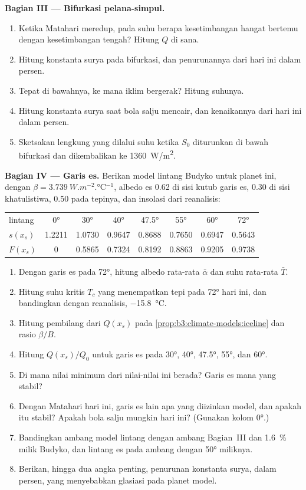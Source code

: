 \begin{problem}
\medskip\noindent\textbf{Bagian III --- Bifurkasi pelana-simpul.}
\begin{enumerate}[resume]
\item Ketika Matahari meredup, pada suhu berapa kesetimbangan hangat bertemu
  dengan kesetimbangan tengah? Hitung $Q$ di sana.
\item Hitung konstanta surya pada bifurkasi, dan penurunannya dari
  hari ini dalam persen.
\item Tepat di bawahnya, ke mana iklim bergerak? Hitung suhunya.
\item Hitung konstanta surya saat bola salju mencair, dan kenaikannya
  dari hari ini dalam persen.
\item Sketsakan lengkung yang dilalui suhu ketika $S_0$ diturunkan
  di bawah bifurkasi dan dikembalikan ke \qty{1360}{W/m^2}.
\end{enumerate}

\medskip\noindent\textbf{Bagian IV --- Garis es.} Berikan model lintang Budyko
untuk planet ini, dengan $\beta = \qty{3.739}{W.m^{-2}.\celsius^{-1}}$,
albedo es 0.62 di sisi kutub garis es, 0.30 di sisi khatulistiwa, 0.50 pada
tepinya, dan insolasi dari reanalisis:
\begin{center}
\begin{tabular}{lccccccc}
\hline
lintang & \ang{0} & \ang{30} & \ang{40} & \ang{47.5} & \ang{55} & \ang{60} & \ang{72}\\
$s(x_s)$ & 1.2211 & 1.0730 & 0.9647 & 0.8688 & 0.7650 & 0.6947 & 0.5643\\
$F(x_s)$ & 0 & 0.5865 & 0.7324 & 0.8192 & 0.8863 & 0.9205 & 0.9738\\
\hline
\end{tabular}
\end{center}
\begin{enumerate}[resume]
\item Dengan garis es pada \ang{72}, hitung albedo rata-rata $\bar\alpha$
  dan suhu rata-rata $\bar T$.
\item Hitung suhu kritis $T_c$ yang menempatkan tepi pada
  \ang{72} hari ini, dan bandingkan dengan reanalisis, \qty{-15.8}{\celsius}.
\item Hitung pembilang dari $Q(x_s)$ pada \cref{prop:b3:climate-models:iceline}
  dan rasio $\beta/B$.
\item Hitung $Q(x_s)/Q_0$ untuk garis es pada \ang{30}, \ang{40},
  \ang{47.5}, \ang{55}, dan \ang{60}.
\item Di mana nilai minimum dari nilai-nilai ini berada? Garis es mana yang stabil?
\item Dengan Matahari hari ini, garis es lain apa yang diizinkan model, dan apakah
  itu stabil? Apakah bola salju mungkin hari ini? (Gunakan kolom \ang{0}.)
\item Bandingkan ambang model lintang dengan ambang Bagian~III
  dan \qty{1.6}{\percent} milik Budyko, dan lintang es pada
  ambang dengan \ang{50} miliknya.
\item Berikan, hingga dua angka penting, penurunan konstanta surya, dalam
  persen, yang menyebabkan glasiasi pada planet model.
\end{enumerate}
\end{problem}
